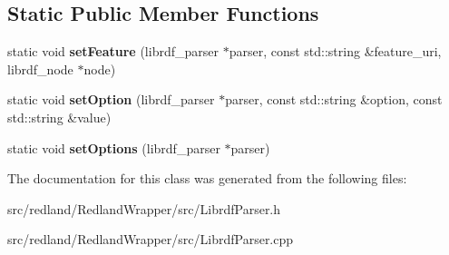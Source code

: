 \subsection*{Static Public Member Functions}
\begin{DoxyCompactItemize}
\item 
\mbox{\label{classredland_1_1LibrdfParser_a9fa0b6b0d21fbc8c6dd0027b66a26eb5}} 
static void {\bfseries set\+Feature} (librdf\+\_\+parser $\ast$parser, const std\+::string \&feature\+\_\+uri, librdf\+\_\+node $\ast$node)
\item 
\mbox{\label{classredland_1_1LibrdfParser_aafc4a6e2748ee1175471ed0815d77eff}} 
static void {\bfseries set\+Option} (librdf\+\_\+parser $\ast$parser, const std\+::string \&option, const std\+::string \&value)
\item 
\mbox{\label{classredland_1_1LibrdfParser_a79fcda1e0c2cccfa8a070a1aea196ebd}} 
static void {\bfseries set\+Options} (librdf\+\_\+parser $\ast$parser)
\end{DoxyCompactItemize}


The documentation for this class was generated from the following files\+:\begin{DoxyCompactItemize}
\item 
src/redland/\+Redland\+Wrapper/src/Librdf\+Parser.\+h\item 
src/redland/\+Redland\+Wrapper/src/Librdf\+Parser.\+cpp\end{DoxyCompactItemize}
